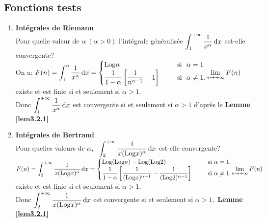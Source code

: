 \documentclass[11pt, a4paper]{book}
\begin{document}
\subsection{Fonctions tests} 
\begin{enumerate}
\item \textbf{Int\'egrales de Riemann}\\
 Pour quelle valeur de $\alpha ~(\alpha>0)$ l'int\'egrale g\'en\'eralis\'ee ${\displaystyle \int_1^{+\infty} \dfrac{1}{x^{\alpha}}\,\mathrm{d} x}$ est-elle convergente?\\
 On a: ${\displaystyle F(n)=\int_1^n \dfrac{1}{x^{\alpha}}\,\mathrm{d} x= \begin{cases} \mathrm{Log} n~&\quad~ \text{si}~~ \alpha=1\\ \dfrac{1}{1-\alpha}\left[\dfrac{1}{n^{\alpha-1}}-1 \right]~&\quad~\text{si}~~ \alpha \neq 1.\end{cases}} \\{\displaystyle  \lim_{n\rightarrow+\infty}F(n)}$ existe et est finie si et seulement si $\alpha>1.$\\
 Donc ${\displaystyle \int_1^{+\infty}\dfrac{1}{x^{\alpha}}\,\mathrm{d} x }$ est convergente si et seulement si $\alpha >1$ d'apr\`es le \textbf{Lemme \ref{lem3.2.1}}
\item \textbf{Int\'egrales de Bertrand}\\
 Pour quelles valeurs de ${\displaystyle \alpha,~~\int_2^{+\infty} \dfrac{1}{x(\mathrm{Log} x)^{\alpha}}\,\mathrm{d} x}$ est-elle convergente?\\
 ${\displaystyle F(n)= \int_2^{+\infty} \dfrac{1}{x(\mathrm{Log} x)^\alpha}\,\mathrm{d} x= \begin{cases} \mathrm{Log}(\mathrm{Log} n)-\mathrm{Log}(\mathrm{Log}2) &\quad~~\text{si}~ \alpha=1.\\ \dfrac{1}{1-\alpha} \left[ \dfrac{1}{(\mathrm{Log} x)^{\alpha-1}}-\dfrac{1}{(\mathrm{Log}2)^{\alpha-1}}\right] &\quad~~\text{si} ~\alpha\neq 1.\end{cases}}\\  {\displaystyle  
 \lim_{n\rightarrow+\infty}F(n)}$ 
 existe et est finie si et seulement si $\alpha>1.$\\ Donc ${\displaystyle \int_2^{+\infty} \dfrac{1}{x(\mathrm{Log} x)^\alpha}\,\mathrm{d} x}$ est convergente si et seulement si $\alpha>1,$ \textbf{Lemme \ref{lem3.2.1} }
\end{enumerate}
\end{document}
